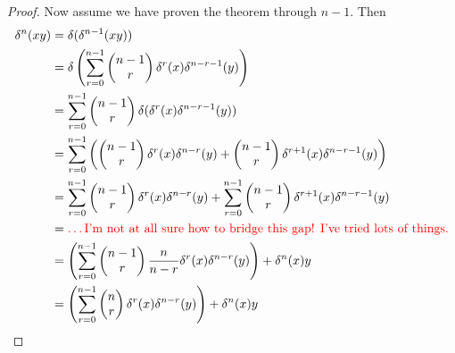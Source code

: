 \documentclass[12pt]{article}
\theoremstyle{definition}
\begin{document}
\begin{proof}
	Now assume we have proven the theorem through $n - 1$.
	Then \begin{align*}
		\delta^n(xy) & = \delta(\delta^{n-1}(xy))                                                                                                                                                 \\
		             & = \delta\left( \sum_{r=0}^{n-1}\begin{pmatrix}n-1 \\ r\end{pmatrix} \delta^r(x)\delta^{n-r - 1}(y) \right)                                                                 \\
		             & = \sum_{r=0}^{n-1}\begin{pmatrix}n-1 \\ r\end{pmatrix} \delta(\delta^r(x)\delta^{n-r - 1}(y))                                                                              \\
		             & = \sum_{r=0}^{n-1}\left(\begin{pmatrix}n-1 \\ r\end{pmatrix} \delta^r(x)\delta^{n-r}(y) + \begin{pmatrix}n-1 \\ r\end{pmatrix}\delta^{r+1}(x)\delta^{n-r - 1}(y)\right)    \\
		             & = \sum_{r=0}^{n-1}\begin{pmatrix}n-1 \\ r\end{pmatrix} \delta^r(x)\delta^{n-r}(y) + \sum_{r=0}^{n-1}\begin{pmatrix}n-1 \\ r\end{pmatrix}\delta^{r+1}(x)\delta^{n-r - 1}(y) \\
		             & = \textcolor{red}{\text{\dots I'm not at all sure how to bridge this gap! I've tried lots of things.}}                                                                     \\
		             & = \left(\sum_{r=0}^{n-1}\begin{pmatrix}n-1 \\ r\end{pmatrix}\frac{n}{n-r} \delta^r(x)\delta^{n-r}(y)\right) + \delta^n(x)y                                                 \\
		             & = \left(\sum_{r=0}^{n-1}\begin{pmatrix}n \\ r\end{pmatrix} \delta^r(x)\delta^{n-r}(y)\right) + \delta^n(x)y                                                                \\

\end{align*}
\end{proof}
\end{document}

